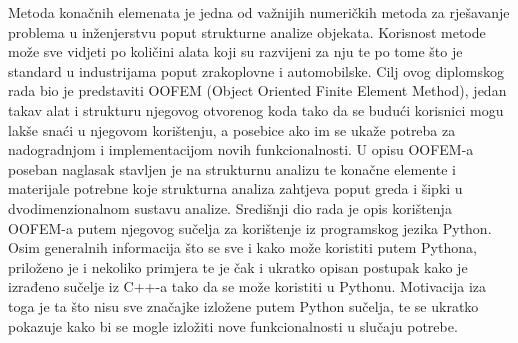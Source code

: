\documentclass[a4paper,twoside,12pt]{memoir} %
\begin{document}



\pagestyle{empty} %


\begin{sazetak}
Metoda konačnih elemenata je jedna od važnijih numeričkih metoda za rješavanje problema u inženjerstvu poput strukturne analize objekata. Korisnost metode može sve vidjeti po količini alata koji su razvijeni za nju te po tome što je standard u industrijama poput zrakoplovne i automobilske. Cilj ovog diplomskog rada bio je predstaviti OOFEM (Object Oriented Finite Element Method), jedan takav alat i strukturu njegovog otvorenog koda tako da se budući korisnici mogu lakše snaći u njegovom korištenju, a posebice ako im se ukaže potreba za nadogradnjom i implementacijom novih funkcionalnosti. U opisu OOFEM-a poseban naglasak stavljen je na strukturnu analizu te konačne elemente i materijale potrebne koje strukturna analiza zahtjeva poput greda i šipki u dvodimenzionalnom sustavu analize. Središnji dio rada je opis korištenja OOFEM-a putem njegovog sučelja za korištenje iz programskog jezika Python.
Osim generalnih informacija što se sve i kako može koristiti putem Pythona, priloženo je i nekoliko primjera te je čak i ukratko opisan postupak kako je izrađeno sučelje iz C++-a tako da se može koristiti u Pythonu. Motivacija iza toga je ta što nisu sve značajke izložene putem Python sučelja, te se ukratko pokazuje kako bi se mogle izložiti nove funkcionalnosti u slučaju potrebe.
\end{sazetak}
\end{document}
